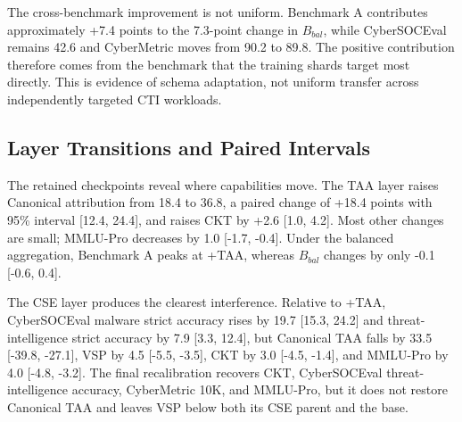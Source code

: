 \documentclass[conference]{IEEEtran}
\begin{document}
The cross-benchmark improvement is not uniform. Benchmark A contributes approximately +7.4 points to the 7.3-point change in $B_{bal}$, while CyberSOCEval remains 42.6 and CyberMetric moves from 90.2 to 89.8. The positive contribution therefore comes from the benchmark that the training shards target most directly. This is evidence of schema adaptation, not uniform transfer across independently targeted CTI workloads.

\subsection{Layer Transitions and Paired Intervals}
The retained checkpoints reveal where capabilities move. The TAA layer raises Canonical attribution from 18.4 to 36.8, a paired change of +18.4 points with 95\% interval [12.4, 24.4], and raises CKT by +2.6 [1.0, 4.2]. Most other changes are small; MMLU-Pro decreases by 1.0 [-1.7, -0.4]. Under the balanced aggregation, Benchmark A peaks at +TAA, whereas $B_{bal}$ changes by only -0.1 [-0.6, 0.4].

The CSE layer produces the clearest interference. Relative to +TAA, CyberSOCEval malware strict accuracy rises by 19.7 [15.3, 24.2] and threat-intelligence strict accuracy by 7.9 [3.3, 12.4], but Canonical TAA falls by 33.5 [-39.8, -27.1], VSP by 4.5 [-5.5, -3.5], CKT by 3.0 [-4.5, -1.4], and MMLU-Pro by 4.0 [-4.8, -3.2]. The final recalibration recovers CKT, CyberSOCEval threat-intelligence accuracy, CyberMetric 10K, and MMLU-Pro, but it does not restore Canonical TAA and leaves VSP below both its CSE parent and the base.
\end{document}
